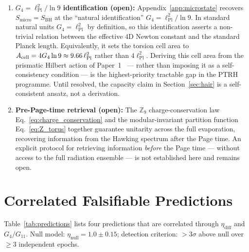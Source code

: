 \documentclass[11pt,a4paper]{article}
\begin{document}
\begin{enumerate}[leftmargin=*, label=\arabic*.]
  \item \textbf{$G_4 = \ell_{\mathrm{Pl}}^2/\ln 9$ identification (open):}
    Appendix~\ref{app:microstate} recovers $S_{\mathrm{micro}} = S_{\mathrm{BH}}$
    at the ``natural identification'' $G_4 = \ell_{\mathrm{Pl}}^2/\ln 9$.  In
    standard natural units $G_4 = \ell_{\mathrm{Pl}}^2$ by definition, so this
    identification asserts a non-trivial relation between the effective 4D Newton
    constant and the standard Planck length.  Equivalently, it sets the torsion
    cell area to $A_{\rm cell} = 4G_4\ln 9 \approx 9.66\,\ell_{\mathrm{Pl}}^2$
    rather than $4\ell_{\mathrm{Pl}}^2$. Deriving this cell area from the
    prismatic Hilbert action of Paper~1~\cite{BresslerPrismatic2026} --- rather
    than imposing it as a self-consistency condition --- is the highest-priority
    tractable gap in the PTRH programme.  Until resolved, the capacity
    claim in Section~\ref{sec:hair} is a self-consistent ansatz, not a
    derivation.

  \item \textbf{Pre-Page-time retrieval (open):} The $\mathbb{Z}_9$
    charge-conservation law Eq.~\eqref{eq:charge_conservation} and
    the modular-invariant partition function Eq.~\eqref{eq:Z_torus} together
    guarantee unitarity across the full evaporation, recovering information
    from the Hawking spectrum after the Page time.  An explicit protocol
    for retrieving information \emph{before} the Page time --- without
    access to the full radiation ensemble --- is not established here and
    remains open.
\end{enumerate}

\section{Correlated Falsifiable Predictions}
\label{sec:predictions}

Table~\ref{tab:predictions} lists four predictions that are correlated through
$\eta_{\mathrm{diff}}$ and $G_4/G_{11}$.  Null model: $\eta_{\mathrm{null}} = 1.0\pm0.15$;
detection criterion: $>3\sigma$ above null over $\geq 3$ independent epochs.
\end{document}
